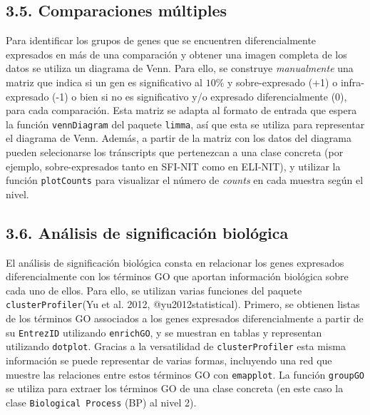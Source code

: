 \documentclass[
]{article}
\begin{document}
\hypertarget{comparaciones-muxfaltiples}{%
\subsection{3.5. Comparaciones
múltiples}\label{comparaciones-muxfaltiples}}

Para identificar los grupos de genes que se encuentren diferencialmente
expresados en más de una comparación y obtener una imagen completa de
los datos se utiliza un diagrama de Venn. Para ello, se construye
\emph{manualmente} una matriz que indica si un gen es significativo al
\(10\%\) y sobre-expresado (+1) o infra-expresado (-1) o bien si no es
significativo y/o expresado diferencialmente (0), para cada comparación.
Esta matriz se adapta al formato de entrada que espera la función
\texttt{vennDiagram} del paquete \texttt{limma}, así que esta se utiliza
para representar el diagrama de Venn. Además, a partir de la matriz con
los datos del diagrama pueden selecionarse los tránscripts que
pertenezcan a una clase concreta (por ejemplo, sobre-expresados tanto en
SFI-NIT como en ELI-NIT), y utilizar la función \texttt{plotCounts} para
visualizar el número de \emph{counts} en cada muestra según el nivel.

\hypertarget{anuxe1lisis-de-significaciuxf3n-bioluxf3gica}{%
\subsection{3.6. Análisis de significación
biológica}\label{anuxe1lisis-de-significaciuxf3n-bioluxf3gica}}

El análisis de significación biológica consta en relacionar los genes
expresados diferencialmente con los términos GO que aportan información
biológica sobre cada uno de ellos. Para ello, se utilizan varias
funciones del paquete \texttt{clusterProfiler}(Yu et al. 2012,
@yu2012statistical). Primero, se obtienen listas de los términos GO
associados a los genes expresados diferencialmente a partir de su
\texttt{EntrezID} utilizando \texttt{enrichGO}, y se muestran en tablas
y representan utilizando \texttt{dotplot}. Gracias a la versatilidad de
\texttt{clusterProfiler} esta misma información se puede representar de
varias formas, incluyendo una red que muestre las relaciones entre estos
términos GO con \texttt{emapplot}. La función \texttt{groupGO} se
utiliza para extraer los términos GO de una clase concreta (en este caso
la clase \texttt{Biological\ Process} (BP) al nivel 2).
\end{document}
